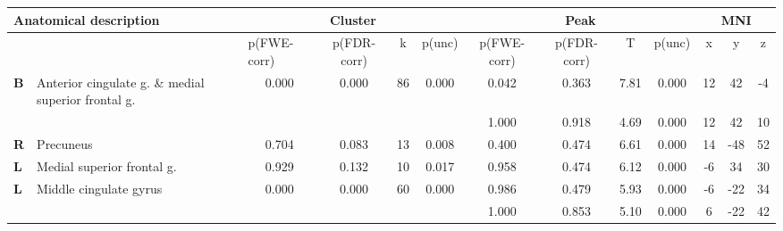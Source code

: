 \begin{landscape}
\begin{table}[!ht]
    \vspace*{-4cm}
    \raggedright
    \footnotesize
\begin{tabular}{ll|cccc|cccc|ccc} \\ \hline
        \multicolumn{2}{l}{\textbf{Anatomical description}} & \multicolumn{4}{c}{\textbf{Cluster}} & \multicolumn{4}{c}{\textbf{Peak}} &  \multicolumn{3}{c}{\textbf{MNI}} \\ \hline
        \multicolumn{2}{l}{\textbf{}} & \multicolumn{1}{l}{p(FWE-corr)} & p(FDR-corr) & k & \multicolumn{1}{l}{p(unc)} & p(FWE-corr) & p(FDR-corr) & T & \multicolumn{1}{l}{p(unc)} & x & y & z \\ \hline
        \textbf{B} & Anterior cingulate g. \& medial superior frontal g. & 0.000 & 0.000 & 86 & 0.000 & 0.042 & 0.363 & 7.81 & 0.000 & 12 & 42 & -4 \\
        \textbf{} & & & & & & 1.000 & 0.918 & 4.69 & 0.000 & 12 & 42 & 10 \\
        \textbf{R} & Precuneus & 0.704 & 0.083 & 13 & 0.008 & 0.400 & 0.474 & 6.61 & 0.000 & 14 & -48 & 52 \\
        \textbf{L} & Medial superior frontal g. & 0.929 & 0.132 & 10 & 0.017 & 0.958 & 0.474 & 6.12 & 0.000 & -6 & 34 & 30 \\
        \textbf{L} & Middle cingulate gyrus & 0.000 & 0.000 & 60 & 0.000 & 0.986 & 0.479 & 5.93 & 0.000 & -6 & -22 & 34 \\
        \textbf{} & & & & & & 1.000 & 0.853 & 5.10 & 0.000 & 6 & -22 & 42 \\

\end{tabular}
\end{table}
\end{landscape}
